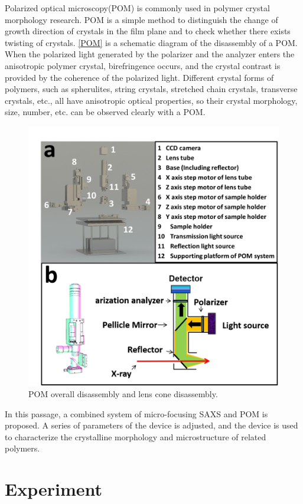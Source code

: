 \documentclass{Head}
\begin{document}
Polarized optical microscopy(POM) is commonly used in polymer crystal morphology research.
POM is a simple method to distinguish the change of growth direction of crystals in the film plane and to check whether there exists twisting of crystals\cite{RN37}.
\autoref{POM} is a schematic diagram of the disassembly of a POM.
When the polarized light generated by the polarizer and the analyzer enters the anisotropic polymer crystal, birefringence occurs, and the crystal contrast is provided by the coherence of the polarized light.
Different crystal forms of polymers, such as spherulites, string crystals, stretched chain crystals, transverse crystals, etc., all have anisotropic optical properties, so their crystal morphology, size, number, etc. can be observed clearly with a POM.
\begin{figure}
    \centering
    \includegraphics[scale=0.4]{Figures/Fig3POM.png}
    \caption{POM overall disassembly and lens cone disassembly.}
    \label{POM}
\end{figure}


In this passage, a combined system of micro-focusing SAXS and POM is proposed.
A series of parameters of the device is adjusted, and the device is used to characterize the crystalline morphology and microstructure of related polymers.
\section{Experiment}
\end{document}
